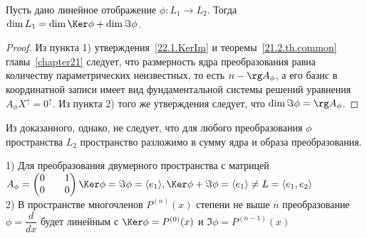 \begin{thm}
Пусть дано линейное отображение $\phi:L_1\rightarrow L_2$. Тогда $\dim L_1=\dim\Ker\phi+\dim\Im\phi$.
\end{thm}
\begin{proof}
Из пункта 1) утверждения~\ref{22.1.KerIm} и теоремы~\ref{21.2.th.common} главы~\textnumero\ref{chapter21} следует, что размерность ядра преобразования равна количеству параметрических неизвестных, то есть $n-\rg A_\phi$, а его базис в координатной записи имеет вид фундаментальной системы решений уравнения $A_\phi X^\uparrow=0^\uparrow$.
Из пункта 2) того же утверждения следует, что $\dim\Im\phi=\rg A_\phi$.
\end{proof}    
\begin{notion}
Из доказанного, однако, не следует, что для любого преобразования $\phi$ пространства $L_2$ пространство разложимо в сумму ядра и образа преобразования.
\end{notion}
\begin{exmpl} $ $ \\
1) Для преобразования двумерного пространства с матрицей $A_\phi=\begin{pmatrix}
0 && 1 \\ 0 && 0
\end{pmatrix} \\
\Ker\phi=\Im\phi=\langle e_1\rangle, \Ker\phi+\Im\phi=\langle e_1\rangle \neq L = \langle e_1, e_2\rangle$  \\
2) В пространстве многочленов $P^{(n)}(x)$ степени не выше $n$ преобразование $\phi=\dfrac{d}{dx}$ будет линейным с $\Ker\phi=P^{(0)}(x)$ и $\Im\phi=P^{(n-1)}(x)$
\end{exmpl}